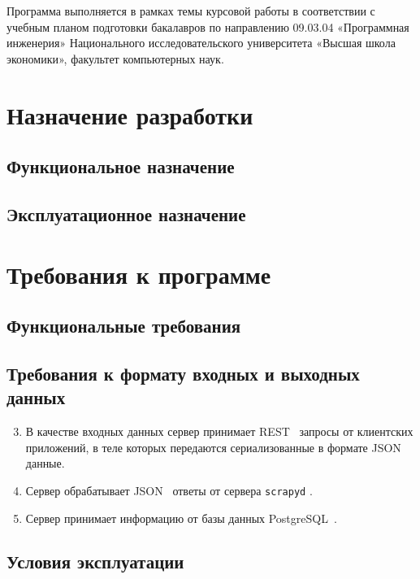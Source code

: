 \documentclass[a4paper,12pt,reqno]{article}
\begin{document}
 Программа выполняется в рамках темы курсовой работы в соответствии с учебным планом подготовки бакалавров по направлению 09.03.04 «Программная инженерия» Национального исследовательского университета «Высшая школа экономики», факультет компьютерных наук.
	
	\newpage 
	\section{Назначение разработки}
	 
	\subsection{Функциональное назначение}
	
	\subsection{Эксплуатационное назначение}
	 
	
						\newpage
	\section{Требования к программе}
	
	\subsection{Функциональные требования}

    
    
    \subsection{Требования к формату входных и выходных данных}

	\begin{enumerate}
		\setcounter{enumii}{2}
		\item В качестве входных данных сервер принимает REST~\cite{rest} запросы от клиентских приложений, в теле которых передаются сериализованные в формате JSON~\cite{json} данные.
		\item Сервер обрабатывает JSON~\cite{json} ответы от сервера \texttt{scrapyd} \cite{scrapyd}.
		\item Сервер принимает информацию от базы данных PostgreSQL~\cite{postgresql}.
	\end{enumerate}
	
	
	\subsection{Условия эксплуатации}
\end{document}

